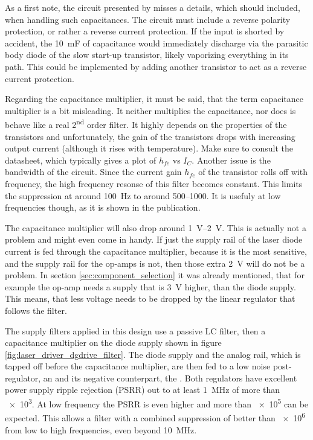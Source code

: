 As a first note, the circuit presented by \citeauthor{laser_driver_qcl_taubman} misses a details, which should included, when handling such capacitances. The circuit must include a reverse polarity protection, or rather a reverse current protection. If the input is shorted by accident, the \qty{10}{\milli\farad} of capacitance would immediately discharge via the parasitic body diode of the slow start-up transistor, likely vaporizing everything in its path. This could be implemented by adding another transistor to act as a reverse current protection.

Regarding the capacitance multiplier, it must be said, that the term capacitance multiplier is a bit misleading. It neither multiplies the capacitance, nor does is behave like a real 2\textsuperscript{nd} order filter. It highly depends on the properties of the transistors and unfortunately, the gain of the transistors drops with increasing output current (although it rises with temperature). Make sure to consult the datasheet, which typically gives a plot of $h_{fe}$ vs $I_C$. Another issue is the bandwidth of the circuit. Since the current gain $h_{fe}$ of the transistor rolls off with frequency, the high frequency resonse of this filter becomes constant. This limits the suppression at around \qty{100}{\Hz} to around \numrange{500}{1000}. It is usefuly at low frequencies though, as it is shown in the publication.

The capacitance multiplier will also drop around \qtyrange[range-units = single]{1}{2}{\V}. This is actually not a problem and might even come in handy. If just the supply rail of the laser diode current is fed through the capacitance multiplier, because it is the most sensitive, and the supply rail for the op-amps is not, then those extra \qty{2}{\V} will do not be a problem. In section \ref{sec:component_selection} it was already mentioned, that for example the  op-amp needs a supply that is \qty{3}{\V} higher, than the diode supply. This means, that less voltage needs to be dropped by the linear regulator that follows the filter.

The supply filters applied in this design use a passive LC filter, then a capacitance multiplier on the diode supply shown in figure \ref{fig:laser_driver_dgdrive_filter}. The diode supply and the analog rail, which is tapped off before the capacitance multiplier, are then fed to a low noise post-regulator, an  and its negative counterpart, the . Both regulators have excellent power supply ripple rejection (PSRR) out to at least \qty{1}{\MHz} of more than \num{e3}. At low frequency the PSRR is even higher and more than \num{e5} can be expected. This allows a filter with a combined suppression of better than \num{e6} from low to high frequencies, even beyond \qty{10}{\MHz}.

